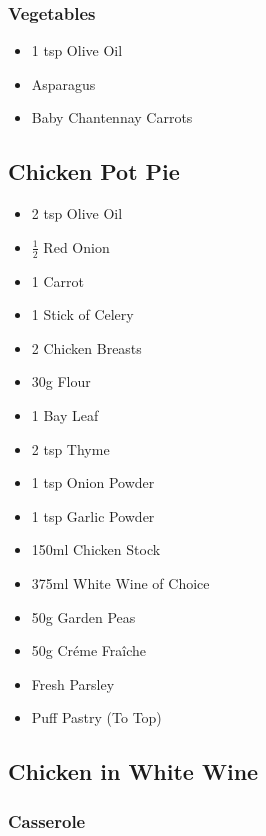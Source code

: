 \documentclass[11pt, english]{article}
\begin{document}
		\subsubsection*{Vegetables}

	\begin{itemize}
        \setlength\itemsep{0cm}
		\item 1 tsp Olive Oil
                \item Asparagus
		\item Baby Chantennay Carrots
        \end{itemize}

\newpage

	\subsection{Chicken Pot Pie}

	\begin{itemize}
	\setlength\itemsep{0cm}
		\item 2 tsp Olive Oil
		\item $\frac{1}{2}$ Red Onion
		\item 1 Carrot
		\item 1 Stick of Celery
		\item 2 Chicken Breasts
		\item 30g Flour
		\item 1 Bay Leaf
		\item 2 tsp Thyme
		\item 1 tsp Onion Powder
		\item 1 tsp Garlic Powder
		\item 150ml Chicken Stock
		\item 375ml White Wine of Choice
		\item 50g Garden Peas
		\item 50g Cr\'{e}me Fra\^{i}che
		\item Fresh Parsley
		\item Puff Pastry (To Top)
	\end{itemize}

\newpage

	\subsection{Chicken in White Wine}

		\subsubsection*{Casserole}
\end{document}
